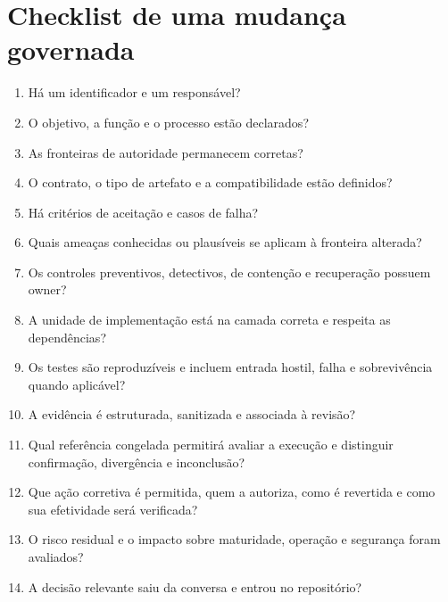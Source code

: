 \documentclass[11pt,a4paper,oneside]{article}
\begin{document}
\section{Checklist de uma mudança governada}
\begin{enumerate}
  \item Há um identificador e um responsável?
  \item O objetivo, a função e o processo estão declarados?
  \item As fronteiras de autoridade permanecem corretas?
  \item O contrato, o tipo de artefato e a compatibilidade estão definidos?
  \item Há critérios de aceitação e casos de falha?
  \item Quais ameaças conhecidas ou plausíveis se aplicam à fronteira alterada?
  \item Os controles preventivos, detectivos, de contenção e recuperação possuem owner?
  \item A unidade de implementação está na camada correta e respeita as dependências?
  \item Os testes são reproduzíveis e incluem entrada hostil, falha e sobrevivência quando aplicável?
  \item A evidência é estruturada, sanitizada e associada à revisão?
  \item Qual referência congelada permitirá avaliar a execução e distinguir confirmação, divergência e inconclusão?
  \item Que ação corretiva é permitida, quem a autoriza, como é revertida e como sua efetividade será verificada?
  \item O risco residual e o impacto sobre maturidade, operação e segurança foram avaliados?
  \item A decisão relevante saiu da conversa e entrou no repositório?
\end{enumerate}
\end{document}
